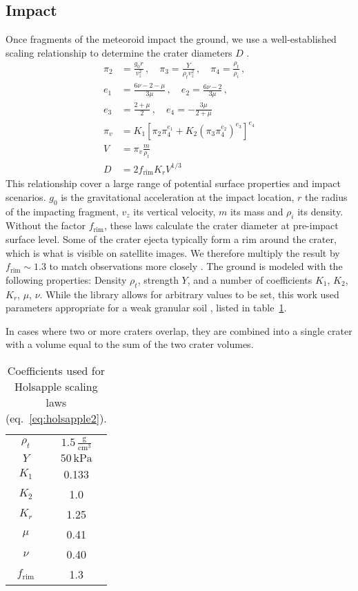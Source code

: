 \subsection{Impact}

Once fragments of the meteoroid impact the ground, we use a well-established scaling relationship to determine the crater diameters $D$ \citep{holsapple1987scaling}.
\begin{align}
    \pi_2 &= \frac{g_0 r}{v_z^2}\,,\quad\pi_3 = \frac{Y}{\rho_t v_z^2}\,,\quad\pi_4 = \frac{\rho_t}{\rho_i}\,, \nonumber \\
    e_1 &= \frac{6\nu - 2 - \mu}{3\mu}\,,\quad e_2 = \frac{6\nu-2}{3\mu} \,, \nonumber \\
    e_3 &= \frac{2+\mu}{2}\,,\quad e_4 = -\frac{3\mu}{2 + \mu} \nonumber \\
    \pi_v &= K_1 \left[\pi_2 \pi_4^{e_1} + K_2 \left(\pi_3 \pi_4^{e_2}\right)^{e_3}\right]^{e_4} \nonumber \\
    V &= \pi_v \frac{m}{\rho_t} \nonumber \\
    D &= 2f_\mathrm{rim} K_r V^{1/3} \label{eq:holsapple2}
\end{align}
This relationship cover a large range of potential surface properties and impact scenarios.
$g_0$ is the gravitational acceleration at the impact location, $r$ the radius of the impacting fragment, $v_z$ its vertical velocity, $m$ its mass and $\rho_i$ its density. Without the factor $f_\mathrm{rim}$, these laws calculate the crater diameter at pre-impact surface level.
Some of the crater ejecta typically form a rim around the crater, which is what is visible on satellite images. We therefore multiply the result by $f_\mathrm{rim} \sim 1.3$ to match observations more closely \citep{citation_needed}. The ground is modeled with the following properties: Density $\rho_t$, strength $Y$, and a number of coefficients $K_1$, $K_2$, $K_r$, $\mu$, $\nu$. While the library allows for arbitrary values to be set, this work used parameters appropriate for a weak granular soil \citep{holsapple1987scaling}, listed in table~\ref{tab:holsapple_coeff}.  

In cases where two or more craters overlap, they are combined into a single crater with a volume equal to the sum of the two crater volumes.

\begin{table}[htbp]
    \centering
    \begin{tabular}{c|c}
        $\rho_t$ & $1.5\,\mathrm{\frac{g}{cm^3}}$ \\
        $Y$ & $50\,\mathrm{kPa}$ \\
        $K_1$ & 0.133 \\
        $K_2$ & 1.0 \\
        $K_r$ & 1.25 \\
        $\mu$ & 0.41 \\
        $\nu$ & 0.40 \\
        $f_\mathrm{rim}$ & 1.3
    \end{tabular}
    \caption{Coefficients used for Holsapple scaling laws (eq.~\ref{eq:holsapple2}).}
    \label{tab:holsapple_coeff}
\end{table}

